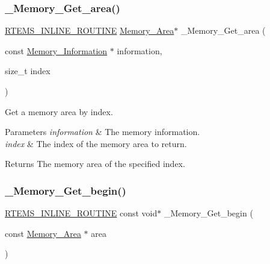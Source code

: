 \subsubsection{\texorpdfstring{\_Memory\_Get\_area()}{\_Memory\_Get\_area()}}
{\footnotesize\ttfamily \mbox{\hyperlink{group__RTEMSScoreBaseDefs_gac216239df231d5dbd15e3520b0b9313f}{R\+T\+E\+M\+S\+\_\+\+I\+N\+L\+I\+N\+E\+\_\+\+R\+O\+U\+T\+I\+NE}} \mbox{\hyperlink{structMemory__Area}{Memory\+\_\+\+Area}}$\ast$ \+\_\+\+Memory\+\_\+\+Get\+\_\+area (\begin{DoxyParamCaption}\item[{const \mbox{\hyperlink{structMemory__Information}{Memory\+\_\+\+Information}} $\ast$}]{information,  }\item[{size\+\_\+t}]{index }\end{DoxyParamCaption})}



Get a memory area by index. 


\begin{DoxyParams}{Parameters}
{\em information} & The memory information. \\
\hline
{\em index} & The index of the memory area to return.\\
\hline
\end{DoxyParams}
\begin{DoxyReturn}{Returns}
The memory area of the specified index. 
\end{DoxyReturn}
\mbox{\label{group__RTEMSScoreMemory_ga2b471b82c609b13f86f857a487292e83}} 
\subsubsection{\texorpdfstring{\_Memory\_Get\_begin()}{\_Memory\_Get\_begin()}}
{\footnotesize\ttfamily \mbox{\hyperlink{group__RTEMSScoreBaseDefs_gac216239df231d5dbd15e3520b0b9313f}{R\+T\+E\+M\+S\+\_\+\+I\+N\+L\+I\+N\+E\+\_\+\+R\+O\+U\+T\+I\+NE}} const void$\ast$ \+\_\+\+Memory\+\_\+\+Get\+\_\+begin (\begin{DoxyParamCaption}\item[{const \mbox{\hyperlink{structMemory__Area}{Memory\+\_\+\+Area}} $\ast$}]{area }\end{DoxyParamCaption})}




